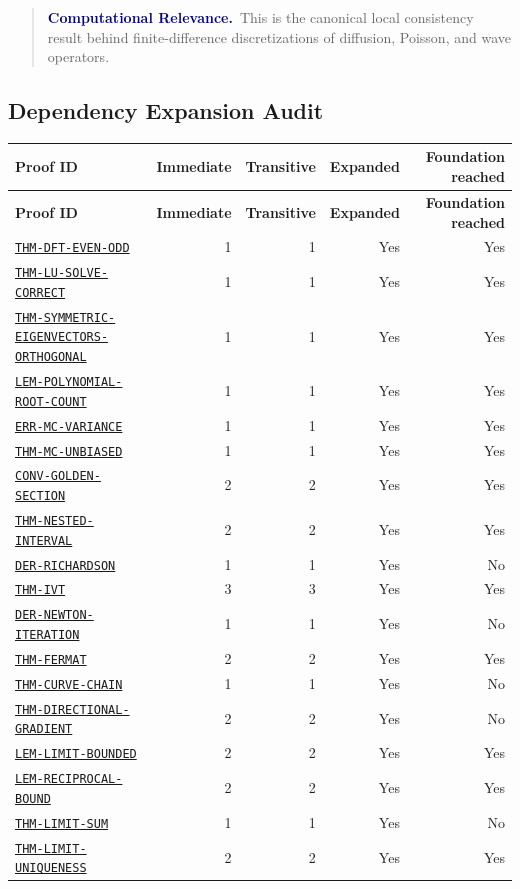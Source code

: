 \documentclass[10pt]{article}
\newcommand{\pidraw}[1]{\begingroup\urlstyle{tt}\nolinkurl{#1}\endgroup}
\newcommand{\pidref}[1]{\hyperref[prf:#1]{\pidraw{#1}}}
\theoremstyle{definition}
\theoremstyle{remark}
\newenvironment{computationalrelevance}
{\begin{quote}\small\noindent\textbf{\textcolor{navy}{Computational Relevance.}}\ }
{\end{quote}}
\begin{document}
\begin{computationalrelevance}This is the canonical local consistency result behind finite-difference discretizations of diffusion, Poisson, and wave operators.\end{computationalrelevance}
\begin{landscape}
\section{Dependency Expansion Audit}
\small
\setlength{\tabcolsep}{8pt}
\begin{longtable}{@{}lrrrr@{}}
\toprule
\textbf{Proof ID} & \textbf{Immediate} & \textbf{Transitive} & \textbf{Expanded} & \textbf{Foundation reached}\\
\midrule
\endfirsthead
\toprule
\textbf{Proof ID} & \textbf{Immediate} & \textbf{Transitive} & \textbf{Expanded} & \textbf{Foundation reached}\\
\midrule
\endhead
\pidref{THM-DFT-EVEN-ODD} & 1 & 1 & Yes & Yes \\
\pidref{THM-LU-SOLVE-CORRECT} & 1 & 1 & Yes & Yes \\
\pidref{THM-SYMMETRIC-EIGENVECTORS-ORTHOGONAL} & 1 & 1 & Yes & Yes \\
\pidref{LEM-POLYNOMIAL-ROOT-COUNT} & 1 & 1 & Yes & Yes \\
\pidref{ERR-MC-VARIANCE} & 1 & 1 & Yes & Yes \\
\pidref{THM-MC-UNBIASED} & 1 & 1 & Yes & Yes \\
\pidref{CONV-GOLDEN-SECTION} & 2 & 2 & Yes & Yes \\
\pidref{THM-NESTED-INTERVAL} & 2 & 2 & Yes & Yes \\
\pidref{DER-RICHARDSON} & 1 & 1 & Yes & No \\
\pidref{THM-IVT} & 3 & 3 & Yes & Yes \\
\pidref{DER-NEWTON-ITERATION} & 1 & 1 & Yes & No \\
\pidref{THM-FERMAT} & 2 & 2 & Yes & Yes \\
\pidref{THM-CURVE-CHAIN} & 1 & 1 & Yes & No \\
\pidref{THM-DIRECTIONAL-GRADIENT} & 2 & 2 & Yes & No \\
\pidref{LEM-LIMIT-BOUNDED} & 2 & 2 & Yes & Yes \\
\pidref{LEM-RECIPROCAL-BOUND} & 2 & 2 & Yes & Yes \\
\pidref{THM-LIMIT-SUM} & 1 & 1 & Yes & No \\
\pidref{THM-LIMIT-UNIQUENESS} & 2 & 2 & Yes & Yes \\

\end{longtable}
\end{landscape}
\end{document}
